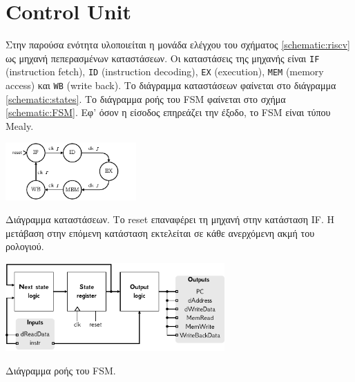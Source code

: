 \section{Control Unit}

Στην παρούσα ενότητα υλοποιείται η μονάδα ελέγχου του σχήματος \ref{schematic:riscv} ως μηχανή πεπερασμένων καταστάσεων. Οι καταστάσεις της μηχανής είναι \texttt{IF} (instruction fetch), \texttt{ID} (instruction decoding), \texttt{EX} (execution), \texttt{MEM} (memory access) και \texttt{WB} (write back). Το διάγραμμα καταστάσεων φαίνεται στο διάγραμμα \ref{schematic:states}. Το διάγραμμα ροής του FSM φαίνεται στο σχήμα \ref{schematic:FSM}. Εφ' όσον η είσοδος επηρεάζει την έξοδο, το FSM είναι τύπου Mealy.\par

\begin{plotenv}[H]
	\centering
	\includegraphics[height=2.2cm]{schematics/FSM_States.pdf}
	\caption{Διάγραμμα καταστάσεων. Το reset επαναφέρει τη μηχανή στην κατάσταση IF. Η μετάβαση στην επόμενη κατάσταση εκτελείται σε κάθε ανερχόμενη ακμή του ρολογιού.}
	\label{schematic:states}
\end{plotenv}

\begin{circuitfig}[H]
	\centering
	\includegraphics[width=8.4cm]{schematics/FSM.pdf}
	\caption{Διάγραμμα ροής του FSM.}
	\label{schematic:FSM}
\end{circuitfig}


